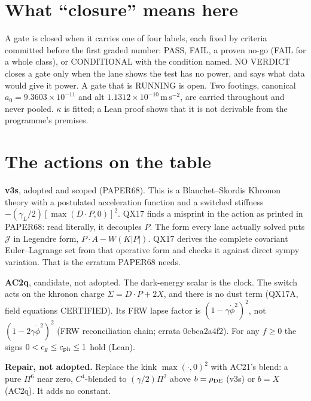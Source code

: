 \documentclass[10pt]{article}
\begin{document}
\section{What ``closure'' means here}
A gate is closed when it carries one of four labels, each fixed by criteria committed before the first graded number: PASS, FAIL, a proven no-go (FAIL for a whole class), or CONDITIONAL with the condition named. NO VERDICT closes a gate only when the lane shows the test has no power, and says what data would give it power. A gate that is RUNNING is open. Two footings, canonical $a_0=9.3603\times10^{-11}$ and alt $1.1312\times10^{-10}$\,m\,s$^{-2}$, are carried throughout and never pooled. $\kappa$ is fitted; a Lean proof shows that it is not derivable from the programme's premises.

\section{The actions on the table}
\textbf{v3s}, adopted and scoped (PAPER68). This is a Blanchet--Skordis Khronon theory with a postulated acceleration function and a switched stiffness $-(\gamma_L/2)[\max(D\!\cdot\!P,0)]^2$.
QX17 finds a misprint in the action as printed in PAPER68: read literally, it decouples $P$. The form every lane actually solved puts $\mathcal J$ in Legendre form, $P\!\cdot\!A-W(K|P|)$. QX17 derives the complete covariant Euler--Lagrange set from that operative form and checks it against direct sympy variation. That is the erratum PAPER68 needs.

\textbf{AC2q}, candidate, not adopted. The dark-energy scalar is the clock. The switch acts on the khronon charge $\Sigma=D\!\cdot\!P+2X$, and there is no dust term (QX17A, field equations CERTIFIED). Its FRW lapse factor is $(1-\gamma\dot\phi^2)^2$, not $(1-2\gamma\dot\phi^2)^2$ (FRW reconciliation chain; errata 0cbca2a4f2). For any $f\ge0$ the signs $0<c_g\le c_{\rm ph}\le1$ hold (Lean).

\textbf{Repair, not adopted.} Replace the kink $\max(\cdot,0)^2$ with AC21's blend: a pure $\Pi^6$ near zero, $C^4$-blended to $(\gamma/2)\Pi^2$ above $b=\rho_{\rm DE}$ (v3s) or $b=X$ (AC2q). It adds no constant.
\end{document}
